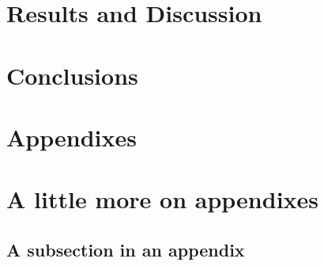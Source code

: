 \documentclass[%
 reprint,
 amsmath,amssymb,
 aps,
]{revtex4-2}
\begin{document}
\section{Results and Discussion}

\section{Conclusions}





\begin{acknowledgments}

\end{acknowledgments}

\appendix

\section{Appendixes}

\section{A little more on appendixes}


\subsection{\label{app:subsec}A subsection in an appendix}





\end{document}
